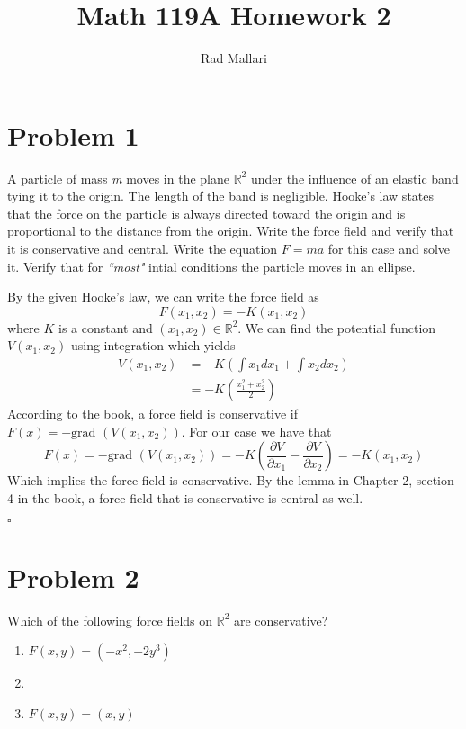 \documentclass[11pt]{article}
\title{Math 119A Homework 2}
\author{Rad Mallari}
\newcommand{\R}{\mathbb{R}}
\newenvironment{proof}{\noindent{\bf Proof.}}{\hfill $\square$\medskip}
\begin{document}
\maketitle

\section{Problem 1}
A particle of mass \textit{m} moves in the plane $\R^{2}$ under the influence of an elastic band tying it to the origin.
The length of the band is negligible. Hooke's law states that the force on the particle is always directed toward
the origin and is proportional to the distance from the origin. Write the force field and verify that it is
conservative and central. Write the equation $F=ma$ for this case and solve it. Verify that for \textit{``most"} intial
conditions the particle moves in an ellipse.

\begin{proof}
By the given Hooke's law, we can write the force field as 
$$F(x_{1},x_{2})=-K(x_{1},x_{2})$$
where $K$ is a constant and $(x_{1},x_{2})\in\R^{2}$. 
We can find the potential function $V(x_{1},x_{2})$ using integration which yields
\begin{equation}
    \begin{split}
        V(x_{1},x_{2})&=-K\left(\int x_{1}dx_{1}+\int x_{2}dx_{2}\right)\\
        &=-K\left(\frac{x_{1}^{2}+x_{2}^{2}}{2}\right)
    \end{split}
\end{equation}
According to the book, a force field is conservative if $F(x)=-\text{grad }(V(x_{1},x_{2}))$. For our case we have that
$$F(x)=-\text{grad }(V(x_{1},x_{2}))=-K\left(\frac{\partial V}{\partial x_{1}}-\frac{\partial V}{\partial x_{2}}\right)=-K(x_{1},x_{2})$$
Which implies the force field is conservative. By the lemma in Chapter 2, section 4 in the book, a force field that is 
conservative is central as well.

\end{proof}

\section{Problem 2}
Which of the following force fields on $\R^{2}$ are conservative?
\begin{enumerate}[label=\textbf{(\alph*)}]
    \item $F(x,y)=(-x^{2},-2y^{3})$
    \item 
    \item $F(x,y)=(x,y)$
\end{enumerate}
\end{document}
